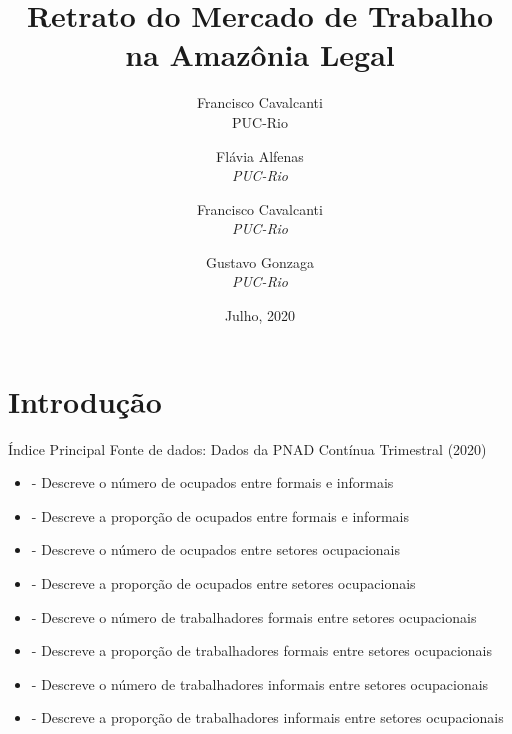 \documentclass[11pt]{beamer}
\author[Francisco Cavalcanti]{Francisco Cavalcanti\\\footnotesize{PUC-Rio}
}
\author{
Flávia  Alfenas\\
\textit{PUC-Rio}\\ \vspace{3mm}
\and  
Francisco Cavalcanti\\
\textit{PUC-Rio}\\ \vspace{3mm}
\and   
Gustavo Gonzaga \\
\textit{PUC-Rio} 
}
\date{Julho, 2020}
\title{Retrato do Mercado de Trabalho na Amazônia Legal}
\begin{document}

\begin{frame}
\titlepage
\end{frame}


\section{Introdução}

\begin{frame}[label=indice_principal]{Índice Principal}
{\footnotesize Fonte de dados: Dados da PNAD Contínua Trimestral (2020)}
\begin{itemize}  
	
\item{
	\hyperlink{_retrato_emprego_bar_formalidade}{} - {\scriptsize Descreve o número de ocupados entre formais e informais}
	}  

\item{
	\hyperlink{_retrato_emprego_pie_formalidade}{} - {\scriptsize Descreve a proporção de ocupados entre formais e informais}
	}  

\item{
	\hyperlink{_retrato_emprego_bar_n_de_ocupado_gstr}{} - {\scriptsize Descreve o número de ocupados entre setores ocupacionais}
	}  
		
		
\item{
	\hyperlink{_retrato_emprego_pie_n_de_ocupado_gstr}{} - {\scriptsize Descreve a proporção de ocupados entre setores ocupacionais}
	}  
		
\item{
	\hyperlink{_retrato_emprego_bar_n_de_formal_gstr}{} - {\scriptsize Descreve o número de trabalhadores formais entre setores ocupacionais}
	}  
		
		
\item{
	\hyperlink{_retrato_emprego_pie_n_de_formal_gstr}{} - {\scriptsize Descreve a proporção de trabalhadores formais entre setores ocupacionais}
	}  
			

\item{
	\hyperlink{_retrato_emprego_bar_n_de_informal_gstr}{} - {\scriptsize Descreve o número de trabalhadores informais entre setores ocupacionais}
	}  
		
\item{
	\hyperlink{_retrato_emprego_pie_n_de_informal_gstr}{} - {\scriptsize Descreve a proporção de trabalhadores informais entre setores ocupacionais}
	}  		
\end{itemize}

\end{frame}
\end{document}
